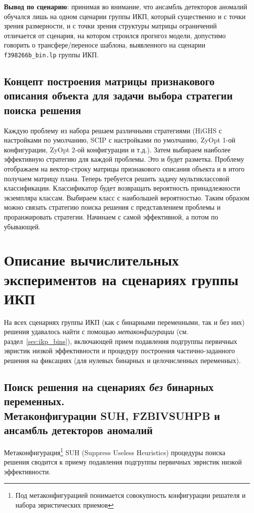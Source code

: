 \documentclass[%
	11pt,
	a4paper,
	utf8,
		]{article}
\begin{document}
\textbf{Вывод по сценарию}: принимая во внимание, что ансамбль детекторов аномалий обучался лишь на одном сценарии группы ИКП, который существенно и с точки зрения размерности, и с точки зрения структуры матрицы ограничений отличается от сценария, на котором строился прогнгоз модели, допустимо говорить о трансфере/переносе шаблона, выявленного на сценарии \texttt{f398266b\_bin.lp} группы ИКП.

\subsection{Концепт построения матрицы признакового описания объекта для задачи выбора стратегии поиска решения}

Каждую проблему из набора решаем различными стратегиями (HiGHS с настройками по умолчанию, SCIP с настройками по умолчанию, ZyOpt 1-ой конфигурации, ZyOpt 2-ой конфигурации и т.д.). Затем выбираем наиболее эффективную стратегию для каждой проблемы. Это и будет разметка. Проблему отображаем на вектор-строку матрицы признакового описания объекта и в итого получаем матрицу плана. Теперь требуется решить задачу мультиклассовой классификации. Классификатор будет возвращать вероятность принадлежности экземпляра классам. Выбираем класс с наибольшей вероятностью. Таким образом можно связать стратегию поиска решения с представлением проблемы и проранжировать стратегии. Начинаем с самой эффективной, а потом по убывающей. 


\section{Описание вычислительных экспериментов на сценариях группы ИКП}\label{sec:ikp}

На всех сценариях группы ИКП (как с бинарными переменными, так и без них) решения удавалось найти с помощью \emph{метаконфигурации} (см. раздел~\ref{sec:ikp_bins}), включающей прием подавления подгруппы первичных эвристик низкой эффективности и процедуру построения частично-заданного решения на фиксациях (для нулевых бинарных и целочисленных переменных). 

\subsection{Поиск решения на сценариях \emph{без} бинарных переменных. \\Метаконфигурации SUH,  FZBIVSUHPB и ансамбль детекторов аномалий}

Метаконфигурация\footnote{Под метаконфигурацией понимается совокупность конфигурации решателя и набора эвристических приемов} SUH (Suppress Useless Heuristics) процедуры поиска решения сводится к приему подавления подгруппы первичных эвристик низкой эффективности.
\end{document}
